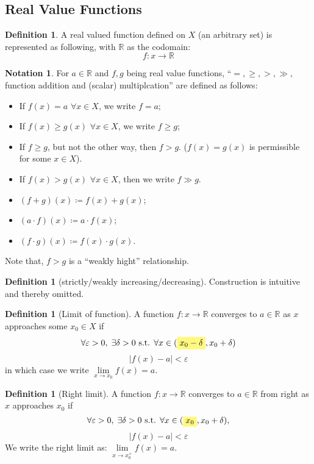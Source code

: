 \documentclass[12pt]{article}
\newcommand{\R}{{\mathbb R}}
\theoremstyle{definition}
\newtheorem{definition}[theorem]{Definition}
\newtheorem{notation}[theorem]{Notation}
\theoremstyle{plain}
\newcommand{\highlight}[1]{%
 \colorbox{yellow!50}{$\displaystyle#1$}}
\begin{document}
\subsection{Real Value Functions}
\setcounter{theorem}{0}

\begin{definition}
    A real valued function defined on $X$ (an arbitrary set) is represented as following, with $\R$ as the
    codomain:
    \[
        f: x \to \R
    \]
\end{definition}
\begin{notation} For $a \in \R$ and $f,g$ being real value functions,
    ``$=, \ge , > , \gg$, function addition and (scalar) multiplcation'' are defined as follows:
    \begin{itemize}
        \item If $f(x) =  a$ $\forall x \in X$, we write $f = a$;
        \item If $f(x) \ge g(x)$ $\forall x \in X$, we write $f \ge g$;
        \item If $f\ge g$, but not the other way, then $f > g$. ($f(x) = g(x)$
            is permissible for some $x \in X$).
        \item If $f(x) > g(x)$ $\forall x \in X$, then we write $f \gg g$.
        \item $(f+g)(x) \coloneqq  f(x) + g(x)$;
        \item $(a\cdot f) (x) \coloneqq a \cdot f(x)$;
        \item $(f\cdot g) (x) \coloneqq f(x) \cdot g(x)$.
    \end{itemize}
    Note that, $f>g$ is a ``weakly hight'' relationship.
\end{notation}

\begin{definition}
    [strictly/weakly increasing/decreasing] Construction is intuitive and
    thereby omitted.
\end{definition}

\begin{definition}
    [Limit of function] A function $f : x \to \R$ converges to $a \in \R$ as $x$
    approaches some $x_0 \in X$ if
    \[
        \forall \varepsilon > 0, \; \exists \delta > 0 \text{ s.t. } \forall x
        \in
        (\highlight{x_0 - \delta}, x_0 + \delta)
    \]
    \[
        |f(x) - a | < \varepsilon
    \]
    in which case we write $\underset{x \to x_0} \lim f(x) = a$.
\end{definition}
\begin{definition}
    [Right limit]
    A function $f : x \to \R$ converges to $a \in \R$ from right as $x$
    approaches $x_0$ if
    \[
        \forall \varepsilon > 0, \; \exists \delta > 0 \text{ s.t. } \forall x
        \in (\highlight{x_0}, x_0 + \delta),
    \]
    \[
        |f(x) - a | < \varepsilon
    \]
    We write the right limit as: $\underset{x\to x_0^+} \lim f(x) = a$.
\end{definition}
\end{document}
